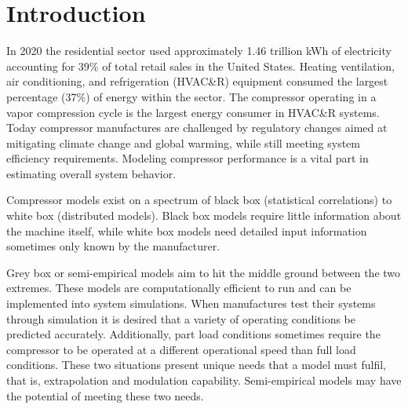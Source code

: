 \documentclass[preprint,11pt,authoryear]{elsarticle}
\begin{document}
\section{Introduction}

In 2020 the residential sector used approximately 1.46 trillion kWh of electricity accounting for 39\% of total retail sales in the United States. Heating ventilation, air conditioning, and refrigeration (HVAC\&R) equipment consumed the largest percentage (37\%) of energy within the sector. The compressor operating in a vapor compression cycle is the largest energy consumer in HVAC\&R systems. Today compressor manufactures are challenged by regulatory changes aimed at mitigating climate change and global warming, while still meeting system efficiency requirements. Modeling compressor performance is a vital part in estimating overall system behavior.

Compressor models exist on a spectrum of black box (statistical correlations) to white box (distributed models). Black box models require little information about the machine itself, while white box models need detailed input information sometimes only known by the manufacturer.
\begin{framed}
\printnomenclature
\end{framed}
Grey box or semi-empirical models aim to hit the middle ground between the two extremes. These models are computationally efficient to run and can be implemented into system simulations. When manufactures test their systems through simulation it is desired that a variety of operating conditions be predicted accurately. Additionally, part load conditions sometimes require the compressor to be operated at a different operational speed than full load conditions. These two situations present unique needs that a model must fulfil, that is, extrapolation and modulation capability. Semi-empirical models may have the potential of meeting these two needs.
\end{document}
